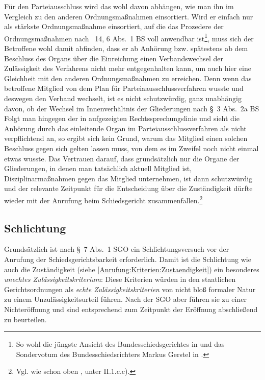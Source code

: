 Für den Parteiausschluss wird das wohl davon abhängen, wie man ihn im Vergleich zu den anderen Ordnungsmaßnahmen einsortiert. Wird er einfach nur als stärkste Ordnungsmaßnahme einsortiert, auf die das Prozedere der Ordnungsmaßnahmen nach \SSS~14, 6 Abs.~1 BS voll anwendbar ist\footnote{So wohl die jüngste Ansicht des Bundesschiedsgerichtes in \cite{BSG3615HS} und das Sondervotum des Bundesschiedsrichters Markus Gerstel in \cite{BSG20131005}.}, muss sich der Betroffene wohl damit abfinden, dass er ab Anhörung  bzw. spätestens ab dem Beschluss des Organs über die Einreichung einen Verbandswechsel der Zulässigkeit des Verfahrens nicht mehr entgegenhalten kann, um auch hier eine Gleichheit mit den anderen Ordnungsmaßnahmen zu erreichen.
Denn wenn das betroffene Mitglied  von dem Plan für Parteiaausschlussverfahren wusste und deswegen den Verband wechselt, ist es nicht schutzwürdig, ganz unabhängig davon, ob der Wechsel im Innenverhältnis der Gliederungen nach \S~3 Abs.~2a BS
Folgt man hingegen der in \cite{BSG20131005} aufgezeigten Rechtssprechungslinie und sieht die Anhörung durch das einleitende Organ im Parteiausschlussverfahren als nicht verpflichtend an, so ergibt sich kein Grund, warum das Mitglied einen solchen Beschluss gegen sich gelten lassen muss, von dem es im Zweifel noch nicht einmal etwas wusste.
Das Vertrauen darauf, dass grundsätzlich nur die Organe der Gliederungen, in denen man tatsächlich aktuell Mitglied ist,  Disziplinarmaßnahmen gegen das Mitglied unternehmen, ist dann schutzwürdig und der relevante Zeitpunkt für die Entscheidung über die Zuständigkeit dürfte wieder mit der Anrufung beim Schiedsgericht zusammenfallen.\footnote{Vgl. wie schon oben \cite[S. 9]{BSG115HS}, unter II.1.c.c).}

\subsection{Schlichtung}
\label{Anrufung:Kriterien:Schlichtung}
Grundsätzlich ist nach \S~7 Abs.~1 SGO ein Schlichtungsversuch vor der Anrufung der Schiedsgerichtsbarkeit erforderlich.
Damit ist die Schlichtung wie auch die Zuständigkeit (siehe \ref{Anrufung:Kriterien:Zustaendigkeit}) ein besonderes \emph{unechtes Zulässigkeitskriterium}: Diese Kriterien würden in den staatlichen Gerichtsordnungen als \emph{echte Zulässigkeitskriterien} von nicht bloß formaler Natur zu einem Unzulässigkeitsurteil führen. Nach der SGO aber führen sie zu einer Nichteröffnung und sind entsprechend zum Zeitpunkt der Eröffnung abschließend zu beurteilen.

